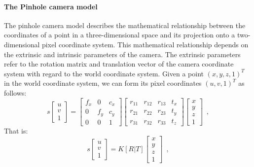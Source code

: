 \paragraph{The Pinhole camera model}
The pinhole camera model describes the mathematical relationship between the coordinates of a point in a three-dimensional space and its projection onto a two-dimensional pixel coordinate system. This mathematical relationship depends on the extrinsic and intrinsic parameters of the camera. The extrinsic parameters refer to the rotation matrix and translation vector of the camera coordinate system with regard to the world coordinate system.
Given a point $(x, y, z, 1)^{T}$ in the world coordinate system, we can form its pixel coordinates $(u, v, 1)^{T}$ as follows:
\begin{equation*}
    s\begin{bmatrix} u\\ v\\ 1 \end{bmatrix} = \begin{bmatrix}
        f_x & 0   & c_x\\ 
        0   & f_y & c_y \\ 
        0   & 0   & 1 
        \end{bmatrix}
        \begin{bmatrix}
        r_{11}& r_{12} & r_{13} & t_{x} \\ 
        r_{21}& r_{22} & r_{23} & t_{y} \\
        r_{31}& r_{32} & r_{33} & t_{z}
        \end{bmatrix}
        \begin{bmatrix} x\\ y\\ z \\ 1 \end{bmatrix}
        \enspace,
\end{equation*}
That is:
\begin{equation*}
    s\begin{bmatrix} u\\ v\\ 1 \end{bmatrix} = K[R|T]
    \begin{bmatrix} x\\ y\\ z \\ 1 \end{bmatrix}
        \enspace,
\end{equation*}

